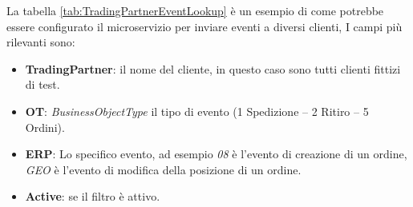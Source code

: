 La tabella \ref{tab:TradingPartnerEventLookup} è un esempio di come potrebbe essere configurato il microservizio per inviare eventi a diversi clienti, I campi più rilevanti sono:
\begin{itemize}
    \item \textbf{TradingPartner}: il nome del cliente, in questo caso sono tutti clienti fittizi di test.
    \item \textbf{OT}: \textit{BusinessObjectType} il tipo di evento (1 Spedizione – 2 Ritiro – 5 Ordini).
    \item \textbf{ERP}: Lo specifico evento, ad esempio \textit{08} è l'evento di creazione di un ordine, \textit{GEO} è l'evento di modifica della posizione di un ordine.
    \item \textbf{Active}: se il filtro è attivo.
\end{itemize}
